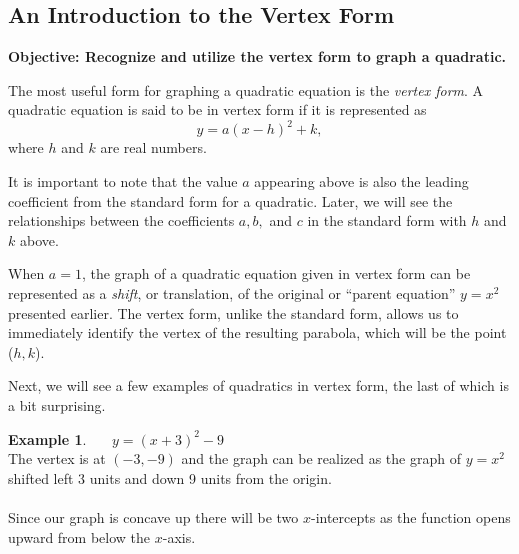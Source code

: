 \documentclass[12pt]{book}
\theoremstyle{definition}
\newtheorem{example}{Example}
\begin{document}
\subsection{An Introduction to the Vertex Form}
{\bf Objective: Recognize and utilize the vertex form to graph a quadratic.}\par
The most useful form for graphing a quadratic equation is the {\it vertex form}.  A quadratic equation is said to be in vertex form if it is represented as $$y=a(x-h)^2+k,$$ where $h$ and $k$ are real numbers.\par
It is important to note that the value $a$ appearing above is also the leading coefficient from the standard form for a quadratic.  Later, we will see the relationships between the coefficients $a,b,$ and $c$ in the standard form with $h$ and $k$ above.\par
When $a=1$, the graph of a quadratic equation given in vertex form can be represented as a {\it shift}, or translation, of the original or ``parent equation'' $y = x^2$ presented earlier.  
The vertex form, unlike the standard form, allows us to immediately identify the vertex of the resulting parabola, which will be the point ($h,k$).\par
Next, we will see a few examples of quadratics in vertex form, the last of which is a bit surprising.
\newpage
\begin{multicols}{2}
\begin{example}~~~$y = (x+3)^2-9$\\

The vertex is at $(-3,-9)$ and the graph can be realized as the graph of $y=x^2$ shifted left 3 units and down 9 units from the origin.\\ \\  
Since our graph is concave up there will be two $x$-intercepts as the function opens upward from below the $x$-axis.

\columnbreak

\begin{center}
\end{center}
\end{example}
\end{multicols}
\end{document}
